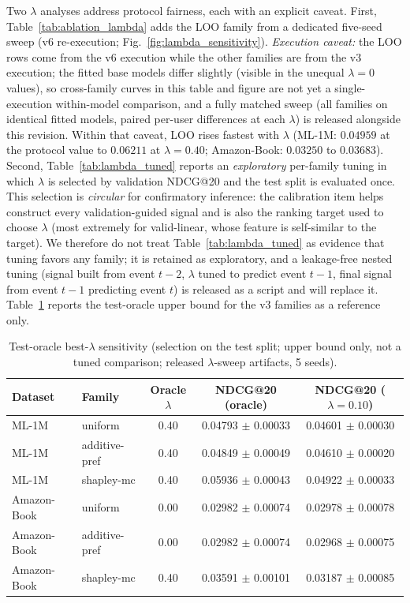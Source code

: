 \documentclass[pdflatex,sn-mathphys-num]{sn-jnl}
\begin{document}
Two $\lambda$ analyses address protocol fairness, each with an explicit caveat. First, Table~\ref{tab:ablation_lambda} adds the LOO family from a dedicated five-seed sweep (v6 re-execution; Fig.~\ref{fig:lambda_sensitivity}). \emph{Execution caveat:} the LOO rows come from the v6 execution while the other families are from the v3 execution; the fitted base models differ slightly (visible in the unequal $\lambda=0$ values), so cross-family curves in this table and figure are not yet a single-execution within-model comparison, and a fully matched sweep (all families on identical fitted models, paired per-user differences at each $\lambda$) is released alongside this revision. Within that caveat, LOO rises fastest with $\lambda$ (ML-1M: $0.04959$ at the protocol value to $0.06211$ at $\lambda=0.40$; Amazon-Book: $0.03250$ to $0.03683$). Second, Table~\ref{tab:lambda_tuned} reports an \emph{exploratory} per-family tuning in which $\lambda$ is selected by validation NDCG@20 and the test split is evaluated once. This selection is \emph{circular} for confirmatory inference: the calibration item helps construct every validation-guided signal and is also the ranking target used to choose $\lambda$ (most extremely for valid-linear, whose feature is self-similar to the target). We therefore do not treat Table~\ref{tab:lambda_tuned} as evidence that tuning favors any family; it is retained as exploratory, and a leakage-free nested tuning (signal built from event $t-2$, $\lambda$ tuned to predict event $t-1$, final signal from event $t-1$ predicting event $t$) is released as a script and will replace it. Table~\ref{tab:lambda_oracle} reports the test-oracle upper bound for the v3 families as a reference only.

\begin{table}[t]
\caption{Test-oracle best-$\lambda$ sensitivity (selection on the test split; upper bound only, not a tuned comparison; released $\lambda$-sweep artifacts, 5 seeds).}\label{tab:lambda_oracle}
\centering
\small
\begin{tabular}{llccc}
\toprule
Dataset & Family & Oracle $\lambda$ & NDCG@20 (oracle) & NDCG@20 ($\lambda{=}0.10$) \\
\midrule
ML-1M & uniform & 0.40 & 0.04793 $\pm$ 0.00033 & 0.04601 $\pm$ 0.00030 \\
ML-1M & additive-pref & 0.40 & 0.04849 $\pm$ 0.00049 & 0.04610 $\pm$ 0.00020 \\
ML-1M & shapley-mc & 0.40 & 0.05936 $\pm$ 0.00043 & 0.04922 $\pm$ 0.00033 \\
Amazon-Book & uniform & 0.00 & 0.02982 $\pm$ 0.00074 & 0.02978 $\pm$ 0.00078 \\
Amazon-Book & additive-pref & 0.00 & 0.02982 $\pm$ 0.00074 & 0.02968 $\pm$ 0.00075 \\
Amazon-Book & shapley-mc & 0.40 & 0.03591 $\pm$ 0.00101 & 0.03187 $\pm$ 0.00085 \\
\bottomrule
\end{tabular}
\end{table}
\end{document}

